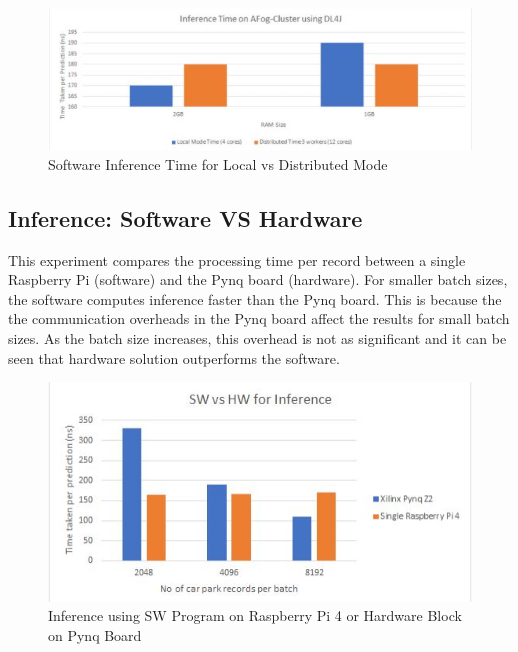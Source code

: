     \begin{figure}[H]
          
          \includegraphics[scale=0.8]{images/Exp3.JPG}
          \caption{ Software Inference Time for Local vs Distributed Mode  }
          \label{fig:Exp3}
              
    \end{figure}
    
\subsection{Inference: Software VS Hardware}
    This experiment compares the processing time per record between a single Raspberry Pi (software) and the Pynq board (hardware). For smaller batch sizes, the software computes inference faster than the Pynq board. This is because the the communication overheads in the Pynq board affect the results for small batch sizes. As the batch size increases, this overhead is not as significant and it can be seen that  hardware solution outperforms the software. 
    
    \begin{figure}[H]
          
          \includegraphics[scale=0.8]{images/Exp4.JPG}
          \caption{Inference using SW Program on Raspberry Pi 4 or Hardware Block on Pynq Board}
          \label{fig:Exp4}
              
    \end{figure}


